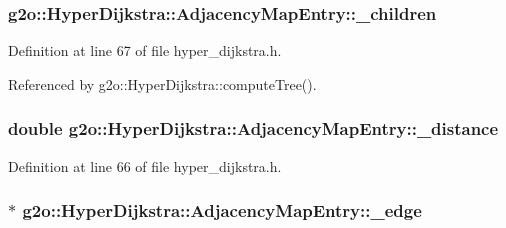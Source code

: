 \subsubsection[{\texorpdfstring{\+\_\+children}{_children}}]{ g2o\+::\+Hyper\+Dijkstra\+::\+Adjacency\+Map\+Entry\+::\+\_\+children\hspace{0.3cm}{\ttfamily [protected]}}\hypertarget{structg2o_1_1HyperDijkstra_1_1AdjacencyMapEntry_a5b69ff3769d50a3229e2df80cac3f093}{}\label{structg2o_1_1HyperDijkstra_1_1AdjacencyMapEntry_a5b69ff3769d50a3229e2df80cac3f093}


Definition at line 67 of file hyper\+\_\+dijkstra.\+h.



Referenced by g2o\+::\+Hyper\+Dijkstra\+::compute\+Tree().

\subsubsection[{\texorpdfstring{\+\_\+distance}{_distance}}]{\setlength{\rightskip}{0pt plus 5cm}double g2o\+::\+Hyper\+Dijkstra\+::\+Adjacency\+Map\+Entry\+::\+\_\+distance\hspace{0.3cm}{\ttfamily [protected]}}\hypertarget{structg2o_1_1HyperDijkstra_1_1AdjacencyMapEntry_a95b3db28f32badcdce2edf1bae83b78d}{}\label{structg2o_1_1HyperDijkstra_1_1AdjacencyMapEntry_a95b3db28f32badcdce2edf1bae83b78d}


Definition at line 66 of file hyper\+\_\+dijkstra.\+h.

\subsubsection[{\texorpdfstring{\+\_\+edge}{_edge}}]{$\ast$ g2o\+::\+Hyper\+Dijkstra\+::\+Adjacency\+Map\+Entry\+::\+\_\+edge\hspace{0.3cm}{\ttfamily [protected]}}\hypertarget{structg2o_1_1HyperDijkstra_1_1AdjacencyMapEntry_adc56c13a328aac02456474a9e7c72415}{}\label{structg2o_1_1HyperDijkstra_1_1AdjacencyMapEntry_adc56c13a328aac02456474a9e7c72415}


